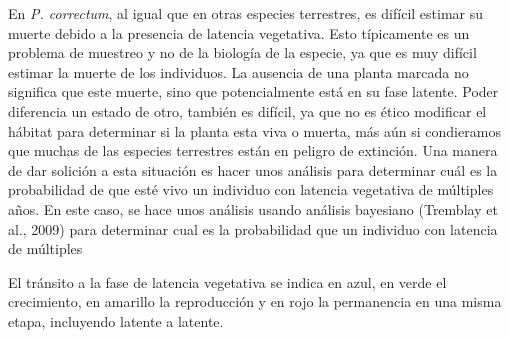 \documentclass[
  12pt,
  letterpaper,
]{book}
\begin{document}
En \emph{P. correctum}, al igual que en otras especies terrestres, es
difícil estimar su muerte debido a la presencia de latencia vegetativa.
Esto típicamente es un problema de muestreo y no de la biología de la
especie, ya que es muy difícil estimar la muerte de los individuos. La
ausencia de una planta marcada no significa que este muerte, sino que
potencialmente está en su fase latente. Poder diferencia un estado de
otro, también es difícil, ya que no es ético modificar el hábitat para
determinar si la planta esta viva o muerta, más aún si condieramos que
muchas de las especies terrestres están en peligro de extinción. Una
manera de dar solición a esta situación es hacer unos análisis para
determinar cuál es la probabilidad de que esté vivo un individuo con
latencia vegetativa de múltiples años. En este caso, se hace unos
análisis usando análisis bayesiano (Tremblay et al., 2009) para
determinar cual es la probabilidad que un individuo con latencia de
múltiples

El tránsito a la fase de latencia vegetativa se indica en azul, en verde
el crecimiento, en amarillo la reproducción y en rojo la permanencia en
una misma etapa, incluyendo latente a latente.
\end{document}
